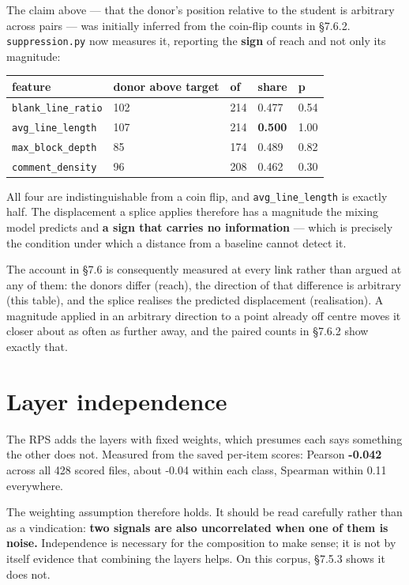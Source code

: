The claim above --- that the donor's position relative to the student is
arbitrary across pairs --- was initially inferred from the coin-flip
counts in \S{}7.6.2. \texttt{suppression.py} now measures it, reporting the
\textbf{sign} of reach and not only its magnitude:

\begin{longtable}[]{@{}lllll@{}}
\toprule\noalign{}
feature & donor above target & of & share & p \\
\midrule\noalign{}
\endhead
\bottomrule\noalign{}
\endlastfoot
\texttt{blank\_line\_ratio} & 102 & 214 & 0.477 & 0.54 \\
\texttt{avg\_line\_length} & 107 & 214 & \textbf{0.500} & 1.00 \\
\texttt{max\_block\_depth} & 85 & 174 & 0.489 & 0.82 \\
\texttt{comment\_density} & 96 & 208 & 0.462 & 0.30 \\
\end{longtable}

All four are indistinguishable from a coin flip, and
\texttt{avg\_line\_length} is exactly half. The displacement a splice
applies therefore has a magnitude the mixing model predicts and
\textbf{a sign that carries no information} --- which is precisely the
condition under which a distance from a baseline cannot detect it.

The account in \S{}7.6 is consequently measured at every link rather than
argued at any of them: the donors differ (reach), the direction of that
difference is arbitrary (this table), and the splice realises the
predicted displacement (realisation). A magnitude applied in an
arbitrary direction to a point already off centre moves it closer about
as often as further away, and the paired counts in \S{}7.6.2 show exactly
that.

\hypertarget{layer-independence}{%
\section{Layer independence}\label{layer-independence}}

The RPS adds the layers with fixed weights, which presumes each says
something the other does not. Measured from the saved per-item scores:
Pearson \textbf{-0.042} across all 428 scored files, about -0.04 within
each class, Spearman within \textpm{}0.11 everywhere.

The weighting assumption therefore holds. It should be read carefully
rather than as a vindication: \textbf{two signals are also uncorrelated
when one of them is noise.} Independence is necessary for the
composition to make sense; it is not by itself evidence that combining
the layers helps. On this corpus, \S{}7.5.3 shows it does not.

